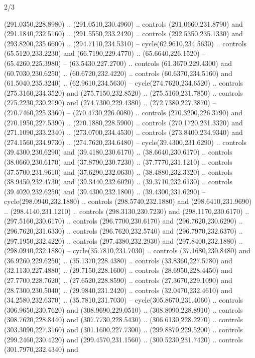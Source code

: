 \begin{flagdescription}{2/3}
\begin{scope}[xshift=0.5\flaglength,yshift=0.5\flagwidth,scale=\stretchfactor]
\begin{scope}[scale=0.001645\flagwidth,yshift=65mm,xshift=-63mm]
\begin{scope}[y=0.80pt, x=0.80pt, yscale=-1,]
\begin{scope}[cm={{1.33333,0.0,0.0,1.33333,(0.0,1e-05)}}]
  (291.0350,228.8980) .. (291.0510,230.4960) .. controls (291.0660,231.8790) and
  (291.1840,232.5160) .. (291.5550,233.2420) .. controls (292.5350,235.1330) and
  (293.8200,235.6600) .. (294.7110,234.5310) -- cycle(62.9610,234.5630) ..
  controls (65.5120,233.2230) and (66.7190,229.4770) .. (65.6640,226.1520) --
  (65.4260,225.3980) -- (63.5430,227.2700) .. controls (61.3670,229.4300) and
  (60.7030,230.6250) .. (60.6720,232.4220) .. controls (60.6370,234.5160) and
  (61.5040,235.3240) .. (62.9610,234.5630) -- cycle(274.7620,234.6520) ..
  controls (275.3160,234.3520) and (275.7150,232.8520) .. (275.5160,231.7850) ..
  controls (275.2230,230.2190) and (274.7300,229.4380) .. (272.7380,227.3870) --
  (270.7460,225.3360) -- (270.4730,226.0080) .. controls (270.3200,226.3790) and
  (270.1950,227.5390) .. (270.1880,228.5900) .. controls (270.1720,231.3320) and
  (271.1090,233.2340) .. (273.0700,234.4530) .. controls (273.8400,234.9340) and
  (274.1560,234.9730) .. (274.7620,234.6480) -- cycle(39.4300,231.6290) ..
  controls (39.4300,230.6290) and (39.4180,230.6170) .. (38.6640,230.6170) ..
  controls (38.0660,230.6170) and (37.8790,230.7230) .. (37.7770,231.1210) ..
  controls (37.5700,231.9610) and (37.6290,232.0630) .. (38.4880,232.3320) ..
  controls (38.9450,232.4730) and (39.3440,232.6020) .. (39.3710,232.6130) ..
  controls (39.4020,232.6250) and (39.4300,232.1800) .. (39.4300,231.6290) --
  cycle(298.0940,232.1880) .. controls (298.5740,232.1880) and
  (298.6410,231.9690) .. (298.4140,231.1210) .. controls (298.3130,230.7230) and
  (298.1170,230.6170) .. (297.5160,230.6170) .. controls (296.7700,230.6170) and
  (296.7620,230.6290) .. (296.7620,231.6330) .. controls (296.7620,232.5740) and
  (296.7970,232.6370) .. (297.1950,232.4220) .. controls (297.4380,232.2930) and
  (297.8400,232.1880) .. (298.0940,232.1880) -- cycle(35.7810,231.7030) ..
  controls (37.1680,230.8480) and (36.9260,229.6250) .. (35.1370,228.4380) ..
  controls (33.8360,227.5780) and (32.1130,227.4880) .. (29.7150,228.1600) ..
  controls (28.6950,228.4450) and (27.7700,228.7620) .. (27.6520,228.8590) ..
  controls (27.3670,229.1090) and (28.7300,230.5040) .. (29.9840,231.2420) ..
  controls (32.0470,232.4610) and (34.2580,232.6370) .. (35.7810,231.7030) --
  cycle(305.8670,231.4060) .. controls (306.9650,230.7620) and
  (308.9690,229.0510) .. (308.8090,228.8910) .. controls (308.7620,228.8440) and
  (307.7730,228.5430) .. (306.6130,228.2270) .. controls (303.3090,227.3160) and
  (301.1600,227.7300) .. (299.8870,229.5200) .. controls (299.2460,230.4220) and
  (299.4570,231.1560) .. (300.5230,231.7420) .. controls (301.7970,232.4340) and

\end{scope}
\end{scope}
\end{scope}
\end{scope}
\end{flagdescription}

